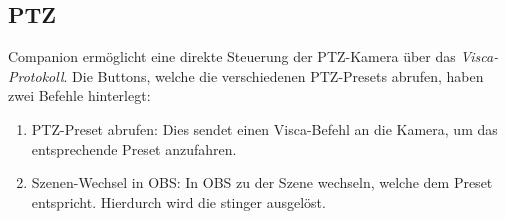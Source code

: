 		\subsection{PTZ}
			Companion ermöglicht eine direkte Steuerung der \Gls{PTZ-Kamera} über das \textit{\Gls{Visca}-Protokoll}. Die Buttons, welche die verschiedenen PTZ-Presets abrufen, haben zwei Befehle hinterlegt:
			\begin{enumerate}
				\item PTZ-Preset abrufen: Dies sendet einen \Gls{Visca}-Befehl an die Kamera, um das entsprechende Preset anzufahren.
				\item Szenen-Wechsel in \Gls{OBS}: In \Gls{OBS} zu der Szene wechseln, welche dem Preset entspricht. Hierdurch wird die \Gls{stinger} ausgelöst.
			\end{enumerate}